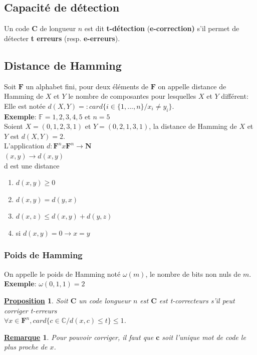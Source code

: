 \documentclass[12pt,openany]{report}
\newtheorem{proposition}{\underline{Proposition}}
\newtheorem{remarque}{\underline{Remarque}}
\begin{document}
\subsection{ Capacité de détection }
Un code $\mathit{\textbf{C}}$
 de longueur $n$ est dit \textbf{t-détection} (\textbf{e-correction)} s'il permet de détecter \textbf{t erreurs} (resp. \textbf{e-erreurs}).\\
\subsection{Distance de Hamming}
Soit $\mathbf{F}$ un alphabet fini, pour deux éléments de $\mathbf{F}$ on appelle distance de Hamming de $X$ et $Y$ le nombre de composantes pour lesquelles $X$ et $Y$ différent: \\
Elle est notée $d(X,Y)=:card{\lbrace i \in \lbrace 1,...,n\rbrace / x_i \neq y_i\rbrace}$. \\
\textbf{Exemple}: $ \mathbb{F}={1,2,3,4,5}$ et $ n=5$\\
Soient $X=(0,1,2,3,1)$ et $Y=(0,2,1,3,1)$, la distance de Hamming de $X$ et $Y$ est  $d(X,Y)=2$.\\
L'application $d:\mathbf{F}^n x \mathbf{F}^n \rightarrow \mathbf{N}$\\
$(x,y)\rightarrow d(x,y)$\\
d est une distance
\begin{enumerate}
\item $d(x,y)\geq 0$
\item $ d(x,y) = d(y,x)$
\item $d(x,z)\leq d(x,y) + d(y,z)$
\item si $d(x,y)=0 \rightarrow x=y$
\end{enumerate}
\subsubsection{Poids de Hamming}
On appelle le poids de Hamming noté $\omega(m)$, le nombre de bits non nuls de $m$.\\
\textbf{Exemple}: $\omega(0,1,1)=2$\\
\begin{proposition}
Soit $\mathbf{C}$ un code longueur $n$ est  $\mathbf{C}$ est t-correcteurs s'il peut corriger t-erreurs\\ $\forall x \in \mathbf{F}^n , card \lbrace c \in \mathbb{C} / d(x,c)\leq t \rbrace  \leq 1$.\\
\end{proposition}
\begin{remarque} Pour pouvoir corriger, il faut que $\mathbf{c}$ soit l'unique mot de code le plus proche de $x$.
\end{remarque}
\end{document}
